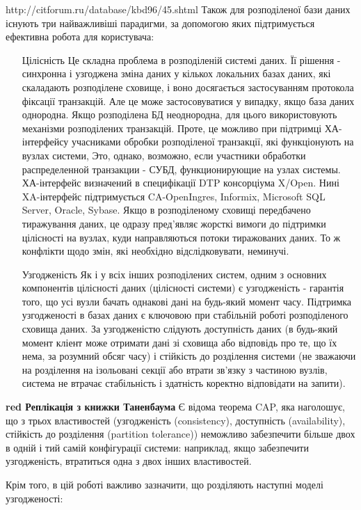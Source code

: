 \documentclass[14pt]{vakthesis}
\begin{document}
http://citforum.ru/database/kbd96/45.shtml
Також для розподіленої бази даних існують три найважливіші парадигми, за допомогою яких підтримується ефективна робота для користувача:
\begin{itemize}
\item[Цілісність] Це складна проблема в розподіленій системі даних. Її рішення - синхронна і узгоджена зміна даних у кількох локальних базах даних, які скаладають розподілене сховище, і воно досягається застосуванням протокола фіксації транзакцій. Але це може застосовуватися у випадку, якщо база даних однородна. Якщо розподілена БД неоднородна, для цього використовують механізми розподілених транзакцій. Проте, це можливо при підтримці ХА-інтерфейсу учасниками обробки розподіленої транзакції, які функціонують на вузлах системи,   Это, однако, возможно, если участники обработки распределенной транзакции - СУБД, функционирующие на узлах системы. ХА-інтерфейс визначений в специфікації DTP консорціума X/Open. Нині XA-інтерфейс підтримується CA-OpenIngres, Informix, Microsoft SQL Server, Oracle, Sybase.
Якщо в розподіленому сховищі передбачено тиражування даних, це одразу пред'являє жорсткі  вимоги до підтримки цілісності на вузлах, куди направляються потоки тиражованих даних. То ж конфлікти щодо змін, які необхідно відслідковувати, неминучі. 
\item[Узгодженість] Як і у всіх інших розподілених систем, одним з основних компонентів цілісності даних (цілісності системи) є узгодженість - гарантія того, що усі вузли бачать однакові дані на будь-який момент часу.
Підтримка узгодженості в базах даних є ключовою при стабільній роботі розподіленого сховища даних. 
За узгодженістю слідують доступність даних (в будь-який момент кліент може отримати дані зі сховища або відповідь про те, що їх нема, за розумний обсяг часу) і стійкість до розділення системи (не зважаючи на розділення на ізольовані секції або втрати зв'язку з частиною вузлів, система не втрачає стабільність і здатність коректно відповідати на запити).

\end{itemize}

{\bfseries{red} Реплікація з книжки Таненбаума}
Є відома теорема CAP, яка наголошує, що з трьох властивостей (узгодженість (consistency), доступність (availability), стійкість до розділення (partition tolerance)) неможливо забезпечити більше двох в одній і тий самій конфігурації системи: наприклад, якщо забезпечити узгодженість, втратиться одна з двох інших властивостей. 

Крім того, в цій роботі важливо зазначити, що розділяють наступні моделі узгодженості:
\end{document}
